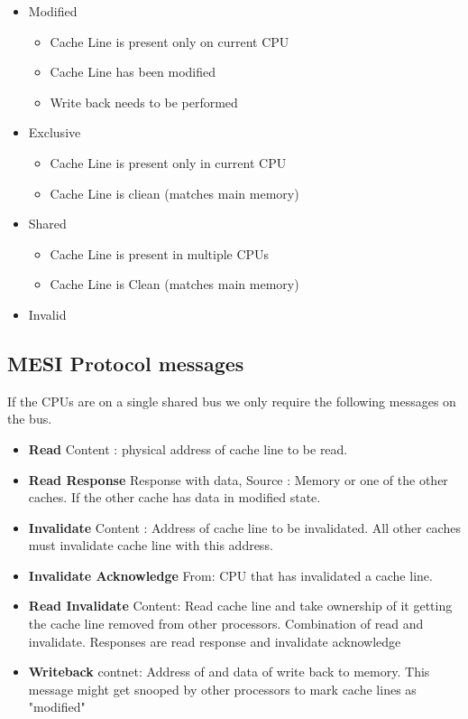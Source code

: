 \documentclass{article}
\begin{document}
\begin{itemize}
\item Modified
  \begin{itemize}
    \item Cache Line is present only on current CPU
    \item Cache Line has been modified
    \item Write back needs to be performed
  \end{itemize}


\item Exclusive
    \begin{itemize}
    \item Cache Line is present only in current CPU
    \item Cache Line is cliean (matches main memory)
    \end{itemize}
    
  \item Shared
    \begin{itemize}
    \item Cache Line is present in multiple CPUs
    \item Cache Line is Clean (matches main memory)
    \end{itemize}
  \item Invalid 
\end{itemize}

\subsection{MESI Protocol messages}

If the CPUs are on a single shared bus we only require the following
messages on the bus.

\begin{itemize}
\item \textbf{Read} Content : physical address of cache line to be
  read.
\item \textbf{Read Response} Response with data, Source : Memory or
  one of the other caches. If the other cache has data in modified
  state.
\item \textbf{Invalidate} Content : Address of cache line to be
  invalidated. All other caches must invalidate cache line with this
  address.

\item \textbf{Invalidate Acknowledge} From: CPU that has invalidated a
  cache line.

\item \textbf{Read Invalidate} Content: Read cache line and take
  ownership of it getting the cache line removed from other
  processors. Combination of read and invalidate. Responses are read
  response and invalidate acknowledge

\item \textbf{Writeback} contnet: Address of and data of write back to
  memory. This message might get snooped by other processors to mark
  cache lines as "modified"  
\end{itemize}
\end{document}
